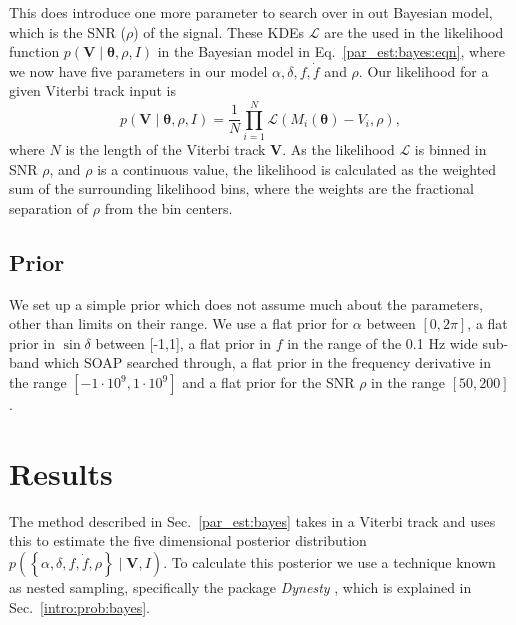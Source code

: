This does introduce one more parameter to search over in out Bayesian model, which is the \gls{SNR} ($\rho$) of the signal.
These \glspl{KDE} $\mathcal{L}$ are the used in the likelihood function $p(\bm{V} \mid \bm{\theta}, \rho, I)$ in the Bayesian model in Eq.~\ref{par_est:bayes:eqn}, where we now have five parameters in our model $\alpha, \delta, f, \dot{f}$ and $\rho$.
Our likelihood for a given Viterbi track input is
\begin{equation}
    p(\bm{V} \mid \bm{\theta}, \rho, I) = \frac{1}{N}\prod_{i = 1}^{N} \mathcal{L}(M_i(\bm{\theta}) - V_i, \rho) ,
\end{equation}
where $N$ is the length of the Viterbi track $\bm{V}$. 
As the likelihood $\mathcal{L}$ is binned in \gls{SNR} $\rho$, and $\rho$ is a continuous value, the likelihood is calculated as the weighted sum of the surrounding likelihood bins, where the weights are the fractional separation of $\rho$ from the bin centers. 

%
\subsection{Prior}
%
We set up a simple prior which does not assume much about the parameters, other than limits on their range. 
We use a flat prior for $\alpha$ between $[0,2\pi]$, a flat prior in $\sin{\delta}$ between [-1,1], a flat prior in $f$ in the range of the 0.1 Hz wide sub-band which SOAP searched through, a flat prior in the frequency derivative in the range $[-1\cdot 10^{9},1\cdot 10^{9}]$ and a flat prior for the \gls{SNR} $\rho$ in the range $[50,200]$.


\clearpage

\section{\label{par_est:results}Results}

The method described in Sec.~\ref{par_est:bayes} takes in a Viterbi track and uses this to estimate the five dimensional posterior distribution $p\left(\left\{ \alpha, \delta, f, \dot{f}, \rho \right\} \mid \bm{V}, I \right)$.
To calculate this posterior we use a technique known as nested sampling, specifically the package {\it Dynesty} \citep{speagle2019DynestyDynamic}, which is explained in Sec.~\ref{intro:prob:bayes}. 

